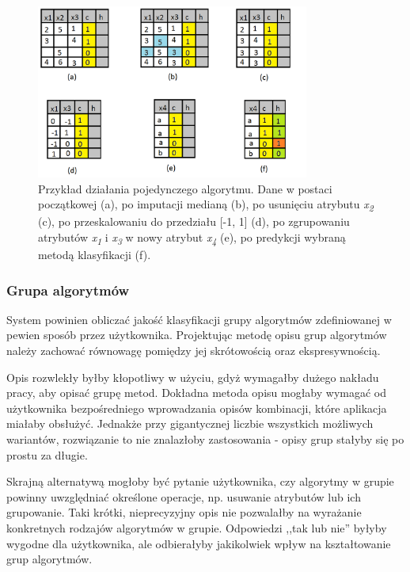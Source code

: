 \documentclass[../thesis.tex]{subfiles}
\begin{document}
\begin{figure}[h]
\centering
\includegraphics[width=0.8\textwidth]{algorithm.png}
\caption{Przykład działania pojedynczego algorytmu. Dane w postaci początkowej (a), po imputacji medianą (b), po usunięciu atrybutu \textit{x\textsubscript{2}} (c), po przeskalowaniu do przedziału [-1, 1] (d), po zgrupowaniu atrybutów \textit{x\textsubscript{1}} i \textit{x\textsubscript{3}} w nowy atrybut \textit{x\textsubscript{4}} (e), po predykcji wybraną metodą klasyfikacji (f).}
\label{req:algorithm}
\end{figure}

\subsubsection{Grupa algorytmów}

System powinien obliczać jakość klasyfikacji grupy algorytmów zdefiniowanej w pewien sposób przez użytkownika. Projektując metodę opisu grup algorytmów należy zachować równowagę pomiędzy jej skrótowością oraz ekspresywnością. 

Opis rozwlekły byłby kłopotliwy w użyciu, gdyż wymagałby dużego nakładu pracy, aby opisać grupę metod. Dokładna metoda opisu mogłaby wymagać od użytkownika bezpośredniego wprowadzania opisów kombinacji, które aplikacja miałaby obsłużyć. Jednakże przy gigantycznej liczbie wszystkich możliwych wariantów, rozwiązanie to nie znalazłoby zastosowania - opisy grup stałyby się po prostu za długie. 

Skrajną alternatywą mogłoby być pytanie użytkownika, czy algorytmy w grupie powinny uwzględniać określone operacje, np. usuwanie atrybutów lub ich grupowanie. Taki krótki, nieprecyzyjny opis nie pozwalałby na wyrażanie konkretnych rodzajów algorytmów w grupie.  Odpowiedzi ,,tak lub nie'' byłyby wygodne dla użytkownika, ale odbierałyby jakikolwiek wpływ na kształtowanie grup algorytmów.
\end{document}
